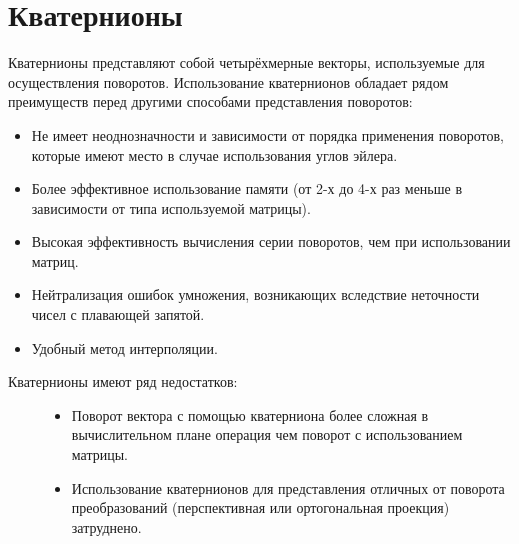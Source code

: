 \documentclass[a4paper,12pt,oneside]{sphinxmanual}
\begin{document}
\section{Кватернионы}
\label{developers:index-5}\label{developers:id15}
Кватернионы представляют собой четырёхмерные векторы, используемые для осуществления поворотов. Использование кватернионов обладает рядом преимуществ перед другими способами представления поворотов:
\begin{itemize}
\item {} 
Не имеет неоднозначности и зависимости от порядка применения поворотов, которые имеют место в случае использования углов эйлера.

\item {} 
Более эффективное использование памяти (от 2-х до 4-х раз меньше в зависимости от типа используемой матрицы).

\item {} 
Высокая эффективность вычисления серии поворотов, чем при использовании матриц.

\item {} 
Нейтрализация ошибок умножения, возникающих вследствие неточности чисел с плавающей запятой.

\item {} 
Удобный метод интерполяции.

\end{itemize}
\begin{description}
\item[{Кватернионы имеют ряд недостатков:}] \leavevmode\begin{itemize}
\item {} 
Поворот вектора с помощью кватерниона более сложная в вычислительном плане операция чем поворот с использованием матрицы.

\item {} 
Использование кватернионов для представления отличных от поворота преобразований (перспективная или ортогональная проекция) затруднено.

\end{itemize}

\end{description}
\end{document}
